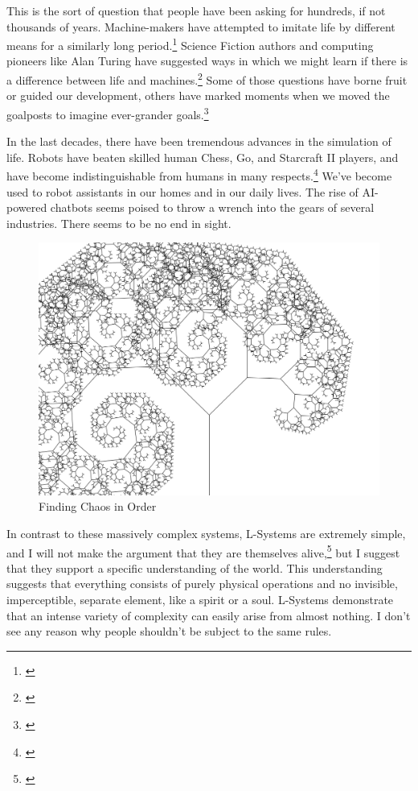 \documentclass[12pt,twoside]{reedthesis}
\begin{document}
	This is the sort of question that people have been asking for hundreds, if not thousands of years. Machine-makers have attempted to imitate life by different means for a similarly long period.\footnote{\cite{riskin2016}} Science Fiction authors and computing pioneers like Alan Turing have suggested ways in which we might learn if there is a difference between life and machines.\footnote{\cite{turing1936}} Some of those questions have borne fruit or guided our development, others have marked moments when we moved the goalposts to imagine ever-grander goals.\footnote{\cite{theory2004}}
	
	In the last decades, there have been tremendous advances in the simulation of life. Robots have beaten skilled human Chess, Go, and Starcraft II players, and have become indistinguishable from humans in many respects.\footnote{\cite{gamerAI2019}} We've become used to robot assistants in our homes and in our daily lives. The rise of AI-powered chatbots seems poised to throw a wrench into the gears of several industries. There seems to be no end in sight.
	
	\begin{figure}[h]
	\centering
	\includegraphics[width=0.6\linewidth]{Images/TiltedTree2}
	\caption{Finding Chaos in Order}
	\label{TiltedTree}
	\end{figure}
	
	In contrast to these massively complex systems, L-Systems are extremely simple, and I will not make the argument that they are themselves alive,\footnote{\cite{theory2004}} but I suggest that they support a specific understanding of the world. This understanding suggests that everything consists of purely physical operations and no invisible, imperceptible, separate element, like a spirit or a soul. L-Systems demonstrate that an intense variety of complexity can easily arise from almost nothing. I don't see any reason why people shouldn't be subject to the same rules.
\end{document}
